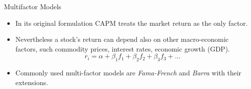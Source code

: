 \documentclass{beamer}
\begin{document}
\begin{frame}{Multifactor Models}
  \begin{itemize}
  \item In its original formulation CAPM treats the market return as the only factor.
  \item Nevertheless a stock’s return can depend also on other macro-economic factors, such commodity prices, interest rates, economic growth (GDP).
    \begin{equation*}
      r_i = \alpha + \beta_1 f_1 + \beta_2 f_2 + \beta_3 f_3 + \ldots
    \end{equation*}
  \item Commonly used multi-factor models are \emph{Fama-French} and \emph{Barra} with their extensions.
  \end{itemize}
\end{frame}
\end{document}
